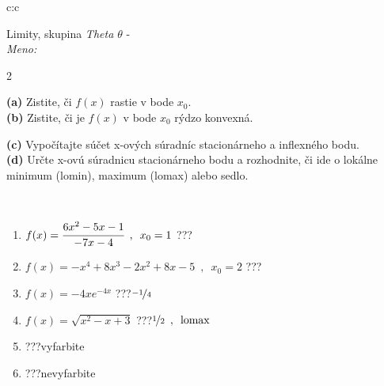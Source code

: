 \documentclass[10pt]{report}
\begin{document}
\begin{tabular}{c:c}
\begin{minipage}[c][104.5mm][t]{0.5\linewidth}
\begin{center}
\vspace{7mm}
{\huge Limity, skupina \textit{Theta $\theta$} -}\\[5mm]
\textit{Meno:}\phantom{xxxxxxxxxxxxxxxxxxxxxxxxxxxxxxxxxxxxxxxxxxxxxxxxxxxxxxxxxxxxxxxxx}\\[5mm]
\begin{minipage}{0.95\linewidth}
\begin{center}
{\small \begin{multicols}{2} \raggedright
\textbf{(a)} Zistite, či \(f(x)\) rastie v bode \(x_0\). \\[1mm]
\textbf{(b)} Zistite, či je \(f(x)\) v bode \(x_0\) rýdzo konvexná. \par \columnbreak
\textbf{(c)} Vypočítajte súčet x-ových súradníc stacionárneho a inflexného bodu. \\[1mm]
\textbf{(d)} Určte x-ovú súradnicu stacionárneho bodu a rozhodnite, či ide o lokálne minimum (lomin), maximum (lomax) alebo sedlo. \\[1mm]
\end{multicols}
}
\end{center}
\end{minipage}
\\[4mm]
\begin{minipage}{0.79\linewidth}
\begin{center}
\begin{varwidth}{\linewidth}
\begin{enumerate}
\normalsize
\item $f(x)=\cfrac{6x^2-5x-1}{-7x-4}\enspace , \enspace x_0=1$\quad \dotfill\; ???\;\dotfill \quad {}
\item $f(x)=-x^4+8x^3-2x^2+8x-5\enspace , \enspace x_0=2$\quad \dotfill\; ???\;\dotfill \quad {}
\item $f(x)=-4xe^{-4x}$\quad \dotfill\; ???\;\dotfill \quad $\nicefrac{-1}{4}$
\item $f(x)=\sqrt{x^2-x+3}$\quad \dotfill\; ???\;\dotfill \quad $\nicefrac{1}{2}\enspace , \enspace\text{lomax}$
\item \quad \dotfill\; ???\;\dotfill \quad vyfarbite
\item \quad \dotfill\; ???\;\dotfill \quad nevyfarbite
\end{enumerate}
\end{varwidth}

\end{center}
\end{minipage}
\end{center}
\end{minipage}
\end{tabular}
\end{document}
